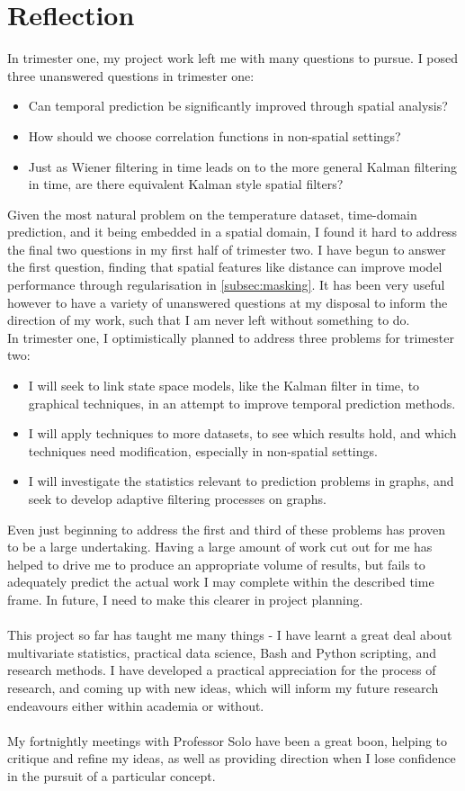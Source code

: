\documentclass[12pt,a4paper]{article} %
\begin{document}
\section{Reflection}
In trimester one, my project work left me with many questions to pursue. I posed three unanswered questions in trimester one:
\begin{itemize}
    \item Can temporal prediction be significantly improved through spatial analysis?
    \item How should we choose correlation functions in non-spatial settings?
    \item Just as Wiener filtering in time leads on to the more general Kalman filtering in time, are there equivalent Kalman style spatial filters?
\end{itemize}
Given the most natural problem on the temperature dataset, time-domain prediction, and it being embedded in a spatial domain, I found it hard to address the final two questions in my first half of trimester two. I have begun to answer the first question, finding that spatial features like distance can improve model performance through regularisation in \ref{subsec:masking}. It has been very useful however to have a variety of unanswered questions at my disposal to inform the direction of my work, such that I am never left without something to do.\\
In trimester one, I optimistically planned to address three problems for trimester two:
\begin{itemize}
    \item I will seek to link state space models, like the Kalman filter in time, to graphical techniques, in an attempt to improve temporal prediction methods.
    \item I will apply techniques to more datasets, to see which results hold, and which techniques need modification, especially in non-spatial settings.
    \item I will investigate the statistics relevant to prediction problems in graphs, and seek to develop adaptive filtering processes on graphs.
\end{itemize}
Even just beginning to address the first and third of these problems has proven to be a large undertaking. Having a large amount of work cut out for me has helped to drive me to produce an appropriate volume of results, but fails to adequately predict the actual work I may complete within the described time frame. In future, I need to make this clearer in project planning.\\\\
This project so far has taught me many things - I have learnt a great deal about multivariate statistics, practical data science, Bash and Python scripting, and research methods. I have developed a practical appreciation for the process of research, and coming up with new ideas, which will inform my future research endeavours either within academia or without.\\\\
My fortnightly meetings with Professor Solo have been a great boon, helping to critique and refine my ideas, as well as providing direction when I lose confidence in the pursuit of a particular concept.
\end{document}
